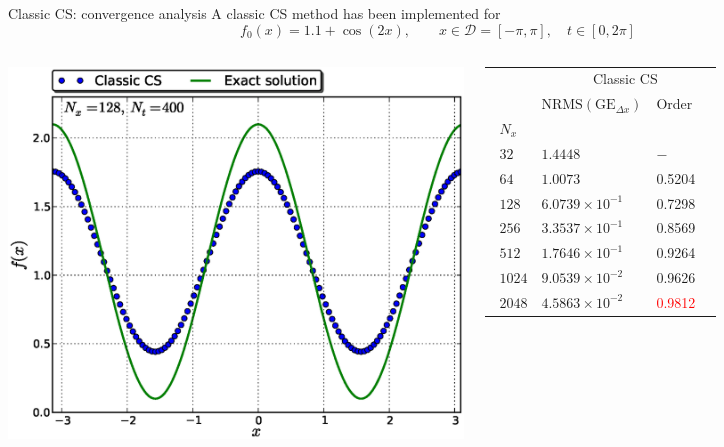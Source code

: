 \documentclass{beamer}
\begin{document}

\begin{frame}{Classic CS: convergence analysis}\vspace{-1.8em}
A classic CS method has been implemented for\vspace{-0.3em}
$$f_0(x) = 1.1 + \cos(2x), \qquad x\in\mathcal{D} = [-\pi, \pi], \quad t\in [0,2\pi]$$\vspace{-1.5em}
\begin{columns}
    \includegraphics[width=\textwidth]{graphics/plot_-_cos2x_ClassicCS__Nx128Nt400_w_f0_itmax}

\begin{tabular}{@{}llll@{}}\toprule
&\multicolumn{3}{c}{\phantom{$^2$ glob }Classic CS} \phantom{Ordera}\\
\cmidrule{2-4}& $\text{NRMS}(\text{GE}_{\Delta x})$ & Order \\ \midrule
$\phantom{a}N_x$\\
$\phantom{a}32$ & $1.4448\phantom{\times 10^{-1}}$ & $-$ \\
$\phantom{a}64$ & $1.0073\phantom{\times 10^{-1}}$ & 0.5204 \\
$\phantom{a}128$ & $6.0739\times 10^{-1}$ & 0.7298 \\
$\phantom{a}256$ & $3.3537\times 10^{-1}$ & 0.8569 \\
$\phantom{a}512$ & $1.7646\times 10^{-1}$ & 0.9264  \\
$\phantom{a}1024$ & $9.0539\times 10^{-2}$ & 0.9626 \\
$\phantom{a}2048$ & $4.5863\times 10^{-2}$ & \textcolor{red}{0.9812} \\
\bottomrule
\end{tabular}

  \end{columns}


\end{frame}
\end{document}
